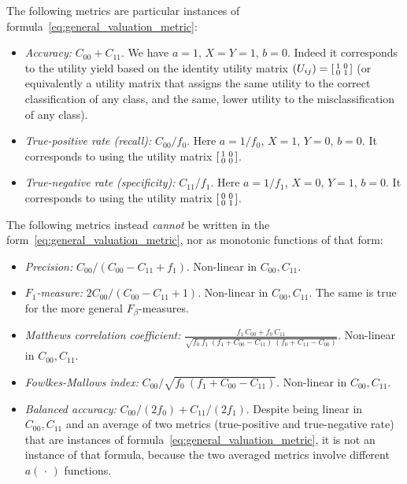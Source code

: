 \documentclass[\ifafour a4paper,12pt,\else a5paper,10pt,\fi%
onecolumn,oneside,article,%
british%
]{memoir}
\theoremstyle{remark}
\theoremstyle{innote}
\newcommand*{\dotv}{\mathord{\,\cdot\,}}%
\renewcommand*{\|}[1][]{\nonscript\:#1\vert\nonscript\:\mathopen{}}
\newcommand*{\itemyes}{{\fontencoding{U}\fontfamily{pzd}\selectfont\symbol{51}}}
\newcommand*{\itemno}{{\fontencoding{U}\fontfamily{pzd}\selectfont\symbol{55}}}
\newcommand*{\cx}{X}
\newcommand*{\cy}{Y}
\begin{document}
The following metrics are particular instances of formula~\eqref{eq:general_valuation_metric}:
\begin{itemize}
\item[\itemyes] \emph{Accuracy:} $C_{00}+C_{11}$. We have $a=1$, $\cx=\cy=1$, $b=0$. Indeed it corresponds to the utility yield based on the identity utility matrix $(U_{ij}) = \begin{bsmallmatrix} 1&0\\0&1 \end{bsmallmatrix}$ (or equivalently a utility matrix that assigns the same utility to the correct classification of any class, and the same, lower utility to the misclassification of any class).
  
\item[\itemyes] \emph{True-positive rate (recall):} $C_{00}/f_{0}$. Here $a=1/f_{0}$, $\cx=1$, $\cy=0$, $b=0$. It corresponds to using the utility matrix $\begin{bsmallmatrix} 1&0\\0&0 \end{bsmallmatrix}$. 

\item[\itemyes] \emph{True-negative rate (specificity):} $C_{11}/f_{1}$. Here $a=1/f_{1}$, $\cx=0$, $\cy=1$, $b=0$. It corresponds to using the utility matrix $\begin{bsmallmatrix} 0&0\\0&1 \end{bsmallmatrix}$. 
\end{itemize}

The following metrics instead \emph{cannot} be written in the form~\eqref{eq:general_valuation_metric}, nor as monotonic functions of that form:
\begin{itemize}
\item[\itemno] \emph{Precision:} $C_{00}/(C_{00}-C_{11}+f_{1})$. Non-linear in $C_{00}, C_{11}$.

\item[\itemno] \emph{$F_{1}$-measure:} $2 C_{00}/(C_{00} - C_{11} + 1)$. Non-linear in $C_{00}, C_{11}$. The same is true for the more general $F_{\beta}$-measures.

\item[\itemno] \emph{Matthews correlation coefficient:} $\frac{
    f_{1}\,C_{00} + f_{0}\,C_{11}}{\sqrt{
      f_{0}\ f_{1}\ (f_{1} + C_{00} - C_{11})\ (f_{0} + C_{11} - C_{00})
    }}$. Non-linear in $C_{00}, C_{11}$.

\item[\itemno] \emph{Fowlkes-Mallows index:} $C_{00}/\sqrt{
      f_{0}\ (f_{1} + C_{00} - C_{11})}$. Non-linear in $C_{00}, C_{11}$.

  \item[\itemno] \emph{Balanced accuracy:} $C_{00}/(2 f_{0}) + C_{11}/(2 f_{1})$. Despite being linear in $C_{00}, C_{11}$ and an average of two metrics (true-positive and true-negative rate) that are instances of formula~\eqref{eq:general_valuation_metric}, it is not an instance of that formula, because the two averaged metrics involve different $a(\dotv)$ functions.
\end{itemize}
\end{document}
